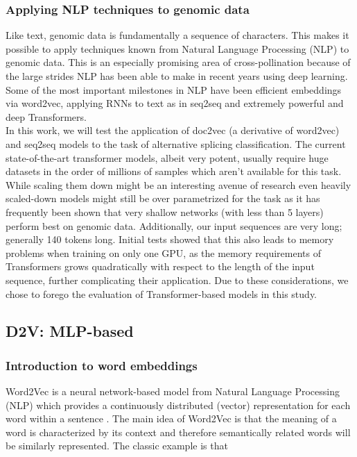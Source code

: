 \subsubsection{Applying NLP techniques to genomic data}
Like text, genomic data is fundamentally a sequence of characters.
This makes it possible to apply techniques known from Natural Language Processing (NLP) to genomic data. This is an especially promising area of cross-pollination because of the large strides NLP has been able to make in recent years using deep learning.
Some of the most important milestones in NLP have been efficient embeddings via word2vec, applying RNNs to text as in seq2seq and extremely powerful and deep Transformers.\\
In this work, we will test the application of doc2vec (a derivative of word2vec) and seq2seq models to the task of alternative splicing classification. The current state-of-the-art transformer models, albeit very potent, usually require huge datasets in the order of millions of samples which aren't available for this task. While scaling them down might be an interesting avenue of research even heavily scaled-down models might still be over parametrized for the task as it has frequently been shown that very shallow networks (with less than 5 layers) perform best on genomic data. Additionally, our input sequences are very long; generally 140 tokens long. Initial tests showed that this also leads to memory problems when training on only one GPU, as the memory requirements of Transformers grows quadratically with respect to the length of the input sequence, further complicating their application. Due to these considerations, we chose to forego the evaluation of Transformer-based models in this study.
\subsection{D2V: MLP-based} \label{subsec:d2v}
\subsubsection{Introduction to word embeddings}
Word2Vec is a neural network-based model from Natural Language Processing (NLP) which provides a continuously distributed (vector) representation for each word within a sentence \cite{w2v1}\cite{w2v2}. The main idea of Word2Vec is that the meaning of a word is characterized by its context and therefore semantically related words will be similarly represented. The classic example is that

